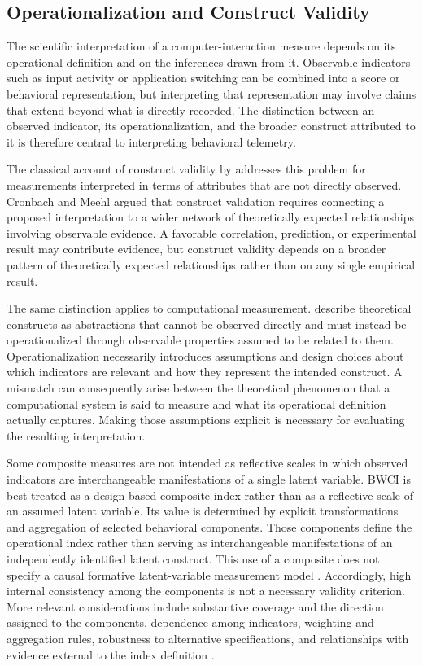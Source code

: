 \subsection{Operationalization and Construct Validity}
The scientific interpretation of a computer-interaction measure depends on its operational definition and on the inferences drawn from it. Observable indicators such as input activity or application switching can be combined into a score or behavioral representation, but interpreting that representation may involve claims that extend beyond what is directly recorded. The distinction between an observed indicator, its operationalization, and the broader construct attributed to it is therefore central to interpreting behavioral telemetry.

The classical account of construct validity by \textcite{cronbach1955constructValidity} addresses this problem for measurements interpreted in terms of attributes that are not directly observed. Cronbach and Meehl argued that construct validation requires connecting a proposed interpretation to a wider network of theoretically expected relationships involving observable evidence. A favorable correlation, prediction, or experimental result may contribute evidence, but construct validity depends on a broader pattern of theoretically expected relationships rather than on any single empirical result.

The same distinction applies to computational measurement. \textcite{jacobs2021measurement} describe theoretical constructs as abstractions that cannot be observed directly and must instead be operationalized through observable properties assumed to be related to them. Operationalization necessarily introduces assumptions and design choices about which indicators are relevant and how they represent the intended construct. A mismatch can consequently arise between the theoretical phenomenon that a computational system is said to measure and what its operational definition actually captures. Making those assumptions explicit is necessary for evaluating the resulting interpretation.

Some composite measures are not intended as reflective scales in which observed indicators are interchangeable manifestations of a single latent variable. BWCI is best treated as a design-based composite index rather than as a reflective scale of an assumed latent variable. Its value is determined by explicit transformations and aggregation of selected behavioral components. Those components define the operational index rather than serving as interchangeable manifestations of an independently identified latent construct. This use of a composite does not specify a causal formative latent-variable measurement model \parencite{bollen2011threeCs,diamantopoulos2001formativeIndex}. Accordingly, high internal consistency among the components is not a necessary validity criterion. More relevant considerations include substantive coverage and the direction assigned to the components, dependence among indicators, weighting and aggregation rules, robustness to alternative specifications, and relationships with evidence external to the index definition \parencite{oecd2008compositeIndicators}.

